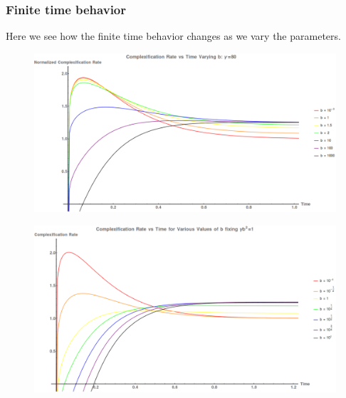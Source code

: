 \documentclass[8pt,aspectratio=169]{beamer}
\begin{document}
\begin{frame}
\frametitle{Finite time behavior}

Here we see how the finite time behavior changes as we vary the parameters.

\begin{minipage}[t]{0.47\linewidth}

\begin{figure}
    \begin{center}
        \includegraphics[scale=0.15]{vary_b_fix_gamma}
    \end{center}
\end{figure}

\end{minipage}\hfill
%
\begin{minipage}[t]{0.47\linewidth}

\begin{figure}
    \begin{center}
        \includegraphics[scale=0.15]{vary_temp}
    \end{center}
\end{figure}

\end{minipage} 

\end{frame}
\end{document}

